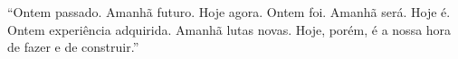 ``Ontem passado. Amanhã futuro. Hoje agora. Ontem foi. Amanhã será. Hoje é. Ontem experiência adquirida. Amanhã lutas novas. Hoje, porém, é a nossa hora de fazer e de construir.''



